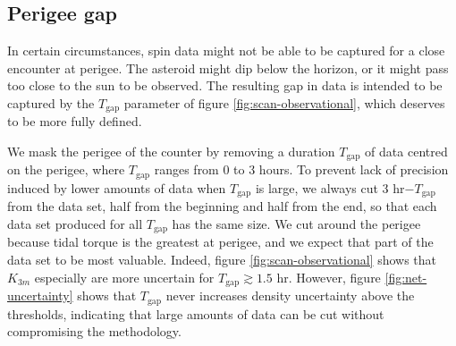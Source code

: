 




\subsection{Perigee gap}
\label{sec:scan-gap}
In certain circumstances, spin data might not be able to be captured for a close encounter at perigee. The asteroid might dip below the horizon, or it might pass too close to the sun to be observed. The resulting gap in data is intended to be captured by the $T_\text{gap}$ parameter of figure \ref{fig:scan-observational}, which deserves to be more fully defined.

We mask the perigee of the counter by removing a duration $T_\text{gap}$ of data centred on the perigee, where $T_\text{gap}$ ranges from 0 to 3 hours. To prevent lack of precision induced by lower amounts of data when $T_\text{gap}$ is large, we always cut 3 hr$-T_\text{gap}$ from the data set, half from the beginning and half from the end, so that each data set produced for all $T_\text{gap}$ has the same size. We cut around the perigee because tidal torque is the greatest at perigee, and we expect that part of the data set to be most valuable. Indeed, figure \ref{fig:scan-observational} shows that $K_{3m}$ especially are more uncertain for $T_\text{gap} \gtrsim 1.5$ hr. However, figure \ref{fig:net-uncertainty} shows that $T_\text{gap}$ never increases density uncertainty above the thresholds, indicating that large amounts of data can be cut without compromising the methodology.